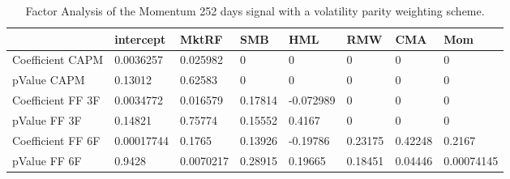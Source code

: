 \begin{table}[H]
\centering
\begin{tabular}{llllllll}
& intercept & MktRF & SMB & HML & RMW & CMA & Mom \\ 
\hline 
Coefficient CAPM & 0.0036257 & 0.025982 & 0 & 0 & 0 & 0 & 0 \\ 
pValue CAPM & 0.13012 & 0.62583 & 0 & 0 & 0 & 0 & 0 \\ 
Coefficient FF 3F & 0.0034772 & 0.016579 & 0.17814 & -0.072989 & 0 & 0 & 0 \\ 
pValue FF 3F & 0.14821 & 0.75774 & 0.15552 & 0.4167 & 0 & 0 & 0 \\ 
Coefficient FF 6F & 0.00017744 & 0.1765 & 0.13926 & -0.19786 & 0.23175 & 0.42248 & 0.2167 \\ 
pValue FF 6F & 0.9428 & 0.0070217 & 0.28915 & 0.19665 & 0.18451 & 0.04446 & 0.00074145 \\ 
\hline
\end{tabular}
\caption{Factor Analysis of the Momentum 252 days signal with a volatility parity weighting scheme.}
\label{MOM252VP_FACTOR}
\end{table}